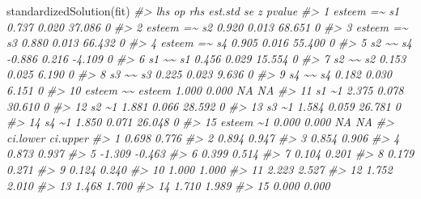 \documentclass[
  11pt,
]{krantz}
\makeatletter
\newenvironment{Shaded}{\begin{snugshade}}{\end{snugshade}}
\newcommand{\CommentTok}[1]{\textcolor[rgb]{0.37,0.37,0.37}{\textit{#1}}}
\newcommand{\FunctionTok}[1]{\textcolor[rgb]{0,0,0}{#1}}
\newcommand{\NormalTok}[1]{#1}
\newenvironment{kframe}{%
\medskip{}
\setlength{\fboxsep}{.8em}
 \def\at@end@of@kframe{}%
 \ifinner\ifhmode%
  \def\at@end@of@kframe{\end{minipage}}%
  \begin{minipage}{\columnwidth}%
 \fi\fi%
 \def\FrameCommand##1{\hskip\@totalleftmargin \hskip-\fboxsep
 \colorbox{shadecolor}{##1}\hskip-\fboxsep
     \hskip-\linewidth \hskip-\@totalleftmargin \hskip\columnwidth}%
 \MakeFramed {\advance\hsize-\width
   \@totalleftmargin\z@ \linewidth\hsize
   \@setminipage}}%
 {\par\unskip\endMakeFramed%
 \at@end@of@kframe}
\renewenvironment{Shaded}{\begin{kframe}}{\end{kframe}}
\theoremstyle{definition}
\theoremstyle{definition}
\theoremstyle{definition}
\theoremstyle{definition}
\theoremstyle{remark}
\makeatother
\begin{document}
\begin{Shaded}
\begin{Highlighting}[]
\FunctionTok{standardizedSolution}\NormalTok{(fit)}
\CommentTok{\#\textgreater{}       lhs op    rhs est.std    se      z pvalue}
\CommentTok{\#\textgreater{} 1  esteem =\textasciitilde{}     s1   0.737 0.020 37.086      0}
\CommentTok{\#\textgreater{} 2  esteem =\textasciitilde{}     s2   0.920 0.013 68.651      0}
\CommentTok{\#\textgreater{} 3  esteem =\textasciitilde{}     s3   0.880 0.013 66.432      0}
\CommentTok{\#\textgreater{} 4  esteem =\textasciitilde{}     s4   0.905 0.016 55.400      0}
\CommentTok{\#\textgreater{} 5      s2 \textasciitilde{}\textasciitilde{}     s4  {-}0.886 0.216 {-}4.109      0}
\CommentTok{\#\textgreater{} 6      s1 \textasciitilde{}\textasciitilde{}     s1   0.456 0.029 15.554      0}
\CommentTok{\#\textgreater{} 7      s2 \textasciitilde{}\textasciitilde{}     s2   0.153 0.025  6.190      0}
\CommentTok{\#\textgreater{} 8      s3 \textasciitilde{}\textasciitilde{}     s3   0.225 0.023  9.636      0}
\CommentTok{\#\textgreater{} 9      s4 \textasciitilde{}\textasciitilde{}     s4   0.182 0.030  6.151      0}
\CommentTok{\#\textgreater{} 10 esteem \textasciitilde{}\textasciitilde{} esteem   1.000 0.000     NA     NA}
\CommentTok{\#\textgreater{} 11     s1 \textasciitilde{}1          2.375 0.078 30.610      0}
\CommentTok{\#\textgreater{} 12     s2 \textasciitilde{}1          1.881 0.066 28.592      0}
\CommentTok{\#\textgreater{} 13     s3 \textasciitilde{}1          1.584 0.059 26.781      0}
\CommentTok{\#\textgreater{} 14     s4 \textasciitilde{}1          1.850 0.071 26.048      0}
\CommentTok{\#\textgreater{} 15 esteem \textasciitilde{}1          0.000 0.000     NA     NA}
\CommentTok{\#\textgreater{}    ci.lower ci.upper}
\CommentTok{\#\textgreater{} 1     0.698    0.776}
\CommentTok{\#\textgreater{} 2     0.894    0.947}
\CommentTok{\#\textgreater{} 3     0.854    0.906}
\CommentTok{\#\textgreater{} 4     0.873    0.937}
\CommentTok{\#\textgreater{} 5    {-}1.309   {-}0.463}
\CommentTok{\#\textgreater{} 6     0.399    0.514}
\CommentTok{\#\textgreater{} 7     0.104    0.201}
\CommentTok{\#\textgreater{} 8     0.179    0.271}
\CommentTok{\#\textgreater{} 9     0.124    0.240}
\CommentTok{\#\textgreater{} 10    1.000    1.000}
\CommentTok{\#\textgreater{} 11    2.223    2.527}
\CommentTok{\#\textgreater{} 12    1.752    2.010}
\CommentTok{\#\textgreater{} 13    1.468    1.700}
\CommentTok{\#\textgreater{} 14    1.710    1.989}
\CommentTok{\#\textgreater{} 15    0.000    0.000}
\end{Highlighting}
\end{Shaded}
\end{document}
